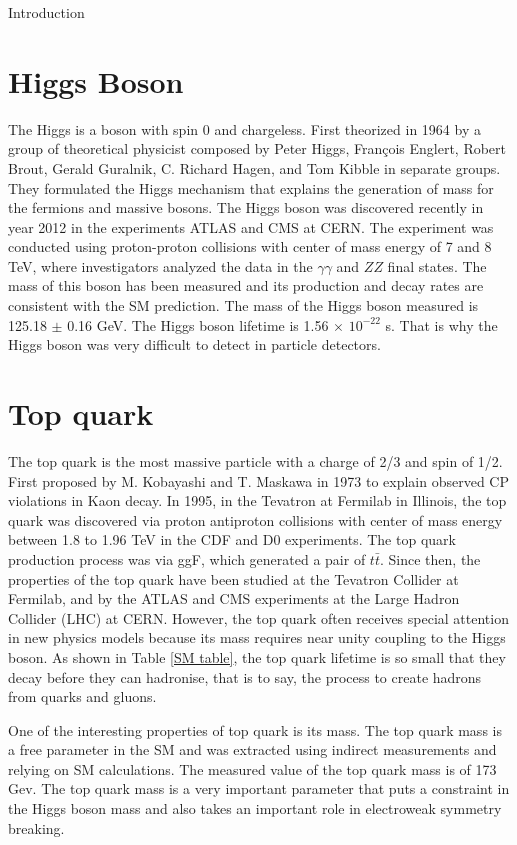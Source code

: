 \begin{chapter}{Introduction}
\newpage

\section{Higgs Boson}
The Higgs is a boson with spin 0 and chargeless. First theorized in 1964 by a group of theoretical physicist composed by Peter Higgs, Fran\c cois Englert, Robert Brout, Gerald Guralnik, C. Richard Hagen, and Tom Kibble in separate groups. They formulated the Higgs mechanism that explains the generation of mass for the fermions and massive bosons. 
The Higgs boson was discovered recently in year 2012 in the experiments ATLAS and CMS at CERN. The experiment was conducted using proton-proton collisions with center of mass energy of 7 and 8 TeV, where investigators analyzed the data in the $\gamma \gamma$ and $ZZ$ final states\cite{higgsd,Aad_2012}. 
The mass of this boson has been measured and its production and decay
rates are consistent with the SM prediction. The mass of the Higgs boson measured is 125.18 $\pm$ 0.16 GeV\cite{pd}. The Higgs boson lifetime is 1.56 $\times$ $10^{-22}$ s. That is why the Higgs boson was very difficult to detect in particle detectors. 

\section{Top quark}
The top quark is the most massive particle with a charge of 2/3 and spin of 1/2. First proposed by M. Kobayashi and T. Maskawa in 1973 to explain observed CP violations in Kaon decay\cite{griff}. In 1995, in the Tevatron at Fermilab in Illinois, the top quark was discovered via proton antiproton collisions with center of mass energy between 1.8 to 1.96 TeV in the CDF and D0 experiments. The top quark production process was via ggF, which generated a pair of $t\bar{t}$\cite{top}.
Since then, the properties of the top quark have been studied at the Tevatron Collider at Fermilab, and by the ATLAS and CMS experiments at the Large Hadron Collider (LHC) at CERN.
However, the top quark often receives special attention in new physics models because its mass requires near unity coupling to the Higgs boson\cite{top}.
As shown in Table \ref{SM table}, the top quark lifetime is so small that they decay before they can hadronise, that is to say, the process to create hadrons from quarks and gluons.

One of the interesting properties of top quark is its mass.
The top quark mass is a free parameter in the SM and was extracted using indirect measurements and relying on SM calculations. The measured value of the top quark mass is of 173 Gev\cite{pd}. The top quark mass is a very important
parameter that puts a constraint in the Higgs boson mass and also takes an important role in electroweak symmetry breaking\cite{top}.


\end{chapter}
